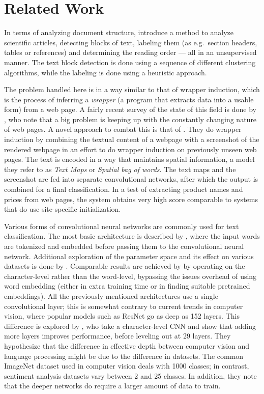 \section{Related Work}

In terms of analyzing document structure, \textcite{klampfl2014unsupervised}
introduce a method to analyze scientific articles, detecting blocks of text,
labeling them (as e.g.\ section headers, tables or references) and determining
the reading order --- all in an unsupervised manner. The text block detection is
done using a sequence of different clustering algorithms, while the labeling is
done using a heuristic approach.

The problem handled here is in a way similar to that of wrapper induction, which
is the process of inferring a \emph{wrapper} (a program that extracts data into
a usable form) from a web page. A fairly recent survey of the state of this
field is done by \textcite{wrapper}, who note that a big problem is keeping up
with the constantly changing nature of web pages.  A novel approach to combat
this is that of \textcite{deepweb}. They do wrapper induction by combining the
textual content of a webpage with a screenshot of the rendered webpage in an
effort to do wrapper induction on previously unseen web pages.  The text is
encoded in a way that maintains spatial information, a model they refer to as
\emph{Text Maps} or \emph{Spatial bag of words}.  The text maps and the
screenshot are fed into separate convolutional networks, after which the output
is combined for a final classification. In a test of extracting product names
and prices from web pages, the system obtains very high score comparable to
systems that do use site-specific initialization.

Various forms of convolutional neural networks are commonly used for text
classification. The most basic architecture is described by
\textcite{kim2014conv}, where the input words are tokenized and embedded before
passing them to the convolutional neural network. Additional exploration of the
parameter space and its effect on various datasets is done by
\textcite{zhang2015conv}. Comparable results are achieved by
\textcite{zhang2015character} by operating on the character-level rather than
the word-level, bypassing the issues overhead of using word embedding (either in
extra training time or in finding suitable pretrained embeddings). All the
previously mentioned architectures use a single convolutional layer; this is
somewhat contrary to current trends in computer vision, where popular models
such as ResNet\citep{resnet2015} go as deep as 152 layers. This difference is
explored by \textcite{Conneau2016ldeep}, who take a character-level CNN and show
that adding more layers improves performance, before leveling out at 29 layers.
They hypothesize that the difference in effective depth between computer vision
and language processing might be due to the difference in datasets. The common
ImageNet dataset used in computer vision deals with 1000 classes; in contrast,
sentiment analysis datasets vary between 2 and 25 classes. In addition, they
note that the deeper networks do require a larger amount of data to train.

